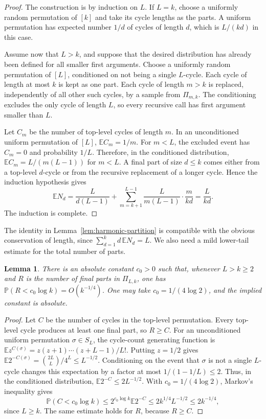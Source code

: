 \documentclass[twoside,12pt]{article}
\numberwithin{equation}{section}
\newtheorem{lemma}[theorem]{Lemma}
\newcommand{\E}{\mathbb{E}}
\newcommand{\Prob}{\mathbb{P}}
\begin{document}
\begin{proof}
The construction is by induction on $L$.  If $L=k$, choose a uniformly random
permutation of $[k]$ and take its cycle lengths as the parts.  A uniform
permutation has expected number $1/d$ of cycles of length $d$, which is
$L/(kd)$ in this case.

Assume now that $L>k$, and suppose that the desired distribution has already
been defined for all smaller first arguments.  Choose a uniformly random
permutation of $[L]$, conditioned on not being a single $L$-cycle.  Each
cycle of length at most $k$ is kept as one part.  Each cycle of length
$m>k$ is replaced, independently of all other such cycles, by a sample from
$\Pi_{m,k}$.  The conditioning excludes the only cycle of length $L$, so every
recursive call has first argument smaller than $L$.

Let $C_m$ be the number of top-level cycles of length $m$.  In an
unconditioned uniform permutation of $[L]$, $\E C_m=1/m$.  For $m<L$, the
excluded event has $C_m=0$ and probability $1/L$.  Therefore, in the
conditioned distribution, $\E C_m=L/(m(L-1))$ for $m<L$.  A final part of size
$d\le k$ comes either from a top-level $d$-cycle or from the recursive
replacement of a longer cycle.  Hence the induction hypothesis gives
\[
 \E N_d
 =\frac{L}{d(L-1)}
   +\sum_{m=k+1}^{L-1}\frac{L}{m(L-1)}\cdot\frac{m}{kd}
 =\frac{L}{kd}.
\]
The induction is complete.
\end{proof}

The identity in Lemma~\ref{lem:harmonic-partition} is compatible with the
obvious conservation of length, since $\sum_{d=1}^k d\,\E N_d=L$.  We also
need a mild lower-tail estimate for the total number of parts.

\begin{lemma}\label{lem:many-parts}
There is an absolute constant $c_0>0$ such that, whenever $L>k\ge2$ and $R$
is the number of final parts in $\Pi_{L,k}$, one has
$\Prob(R<c_0\log k)=O(k^{-1/4})$.  One may take $c_0=1/(4\log2)$, and the
implied constant is absolute.
\end{lemma}

\begin{proof}
Let $C$ be the number of cycles in the top-level permutation.  Every top-level
cycle produces at least one final part, so $R\ge C$.  For an unconditioned
uniform permutation $\sigma\in S_L$, the cycle-count generating function is
$\E z^{C(\sigma)}=z(z+1)\cdots(z+L-1)/L!$.  Putting $z=1/2$ gives $\E 2^{-C(\sigma)}=\binom{2L}{L}/4^L\le L^{-1/2}$.
Conditioning on the event that $\sigma$ is not a single $L$-cycle changes this
expectation by a factor at most $1/(1-1/L)\le2$.  Thus, in the conditioned
distribution, $\E 2^{-C}\le2L^{-1/2}$.  With $c_0=1/(4\log2)$, Markov's
inequality gives
\[
 \Prob(C<c_0\log k)
 \le 2^{c_0\log k}\E 2^{-C}
 \le 2k^{1/4}L^{-1/2}
 \le 2k^{-1/4},
\]
since $L\ge k$.  The same estimate holds for $R$, because $R\ge C$.
\end{proof}
\end{document}
